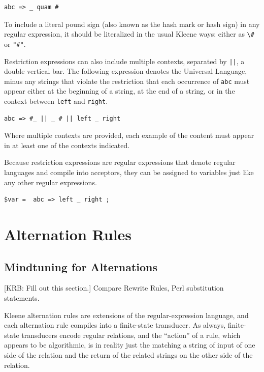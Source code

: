 \documentclass[letterpaper,12pt]{article}
\begin{document}
\begin{Verbatim}[fontsize=\small]
abc => _ quam #
\end{Verbatim}

\noindent
To include a literal pound sign (also known as the hash mark or
hash sign) in any regular expression, it should be literalized in
the usual Kleene ways:  either as \verb!\#! or \verb!"#"!. 

Restriction expressions can also include multiple contexts, separated by
\texttt{||}, a double vertical bar.  The following expression denotes the
Universal Language, minus any strings that violate the restriction that
each occurrence of \texttt{abc} must appear either at the beginning of a
string, at the end of a string, or in the context between \texttt{left}
and \texttt{right}.

\begin{Verbatim}[fontsize=\small]
abc => #_ || _ # || left _ right 
\end{Verbatim}

\noindent
Where multiple contexts are provided, each example of the content
must appear in at least one of the contexts indicated.

Because restriction expressions are regular expressions that denote
regular languages and compile into acceptors, they can be assigned to
variables just like any other regular expressions.

\begin{Verbatim}[fontsize=\small]
$var =  abc => left _ right ;
\end{Verbatim}


\section{Alternation Rules}

\subsection{Mindtuning for Alternations}

[KRB:  Fill out this section.]  Compare Rewrite Rules, Perl substitution statements. 

Kleene alternation rules are extensions of the regular-expression language, and each alternation rule compiles into
a finite-state transducer.  As always, finite-state transducers encode regular relations, and the ``action'' of a
rule, which appears to be algorithmic, is in reality just the matching a string of input of one side of the relation and the
return of the related strings on the other side of the relation.
\end{document}
